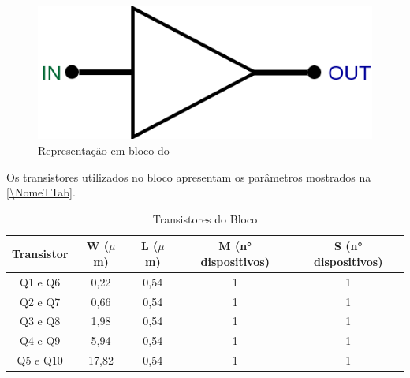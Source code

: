 \begin{figure}[htb]
 \label{NomePFig}
 \centering
    \centering
    \caption{Representa{\c c}\~ao em bloco do \NomeBloco} \label{NomeSFig2}
    \includegraphics[scale=0.3]{Circuitos/Buffer_block.png}
\end{figure}


Os transistores utilizados no bloco \NomeBloco{} apresentam os par\^ametros mostrados na \autoref{\NomeTTab}.

\begin{table}[htb]
\caption{Transistores do Bloco \NomeBloco}
\label{\NomeTTab}
\centering
\begin{tabular}{ccccc}
\toprule
Transistor & W ($\mu$m)  & L ($\mu$m)           & M (n° dispositivos) & S (n° dispositivos)\\
\midrule \midrule
Q1 e Q6 & 0,22 & 0,54 & 1 & 1\\
\midrule
Q2 e Q7 & 0,66 & 0,54 & 1 & 1\\
\midrule
Q3 e Q8 & 1,98 & 0,54 & 1 & 1\\
\midrule
Q4 e Q9 & 5,94 & 0,54 & 1 & 1\\
\midrule
Q5 e Q10 & 17,82 & 0,54 & 1 & 1\\
\bottomrule
\end{tabular}
\end{table}